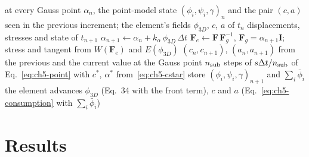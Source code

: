 \begin{algorithm}[htbp]
\caption{One increment $t_n\to t_{n+1}$ of the coupled run}
\label{alg:ch5-coupled}
\begin{algorithmic}[1]
\REQUIRE at every Gauss point $\alpha_n$, the point-model state $(\phi_i,\psi_i,\gamma)_n$ and the pair
  $(c,a)$ seen in the previous increment; the element's fields $\phi_{3D}$, $c$, $a$ of $t_n$
\ENSURE displacements, stresses and state of $t_{n+1}$
    \STATE $\alpha_{n+1}\leftarrow\alpha_n+k_\alpha\,\phi_{3D}\,\Delta t$ 
    \STATE $\mathbf F_e\leftarrow\mathbf F\,\mathbf F_g^{-1}$, $\mathbf F_g=\alpha_{n+1}\mathbf I$; stress and tangent from $W(\mathbf F_e)$ and $E(\phi_{3D})$
        \STATE $(c_n,c_{n+1})$, $(a_n,a_{n+1})$ from the previous and the current value at the Gauss point
        \STATE $n_{\rm sub}$ steps of $s\Delta t/n_{\rm sub}$ of Eq.~\eqref{eq:ch5-point} with $c^*$, $\alpha^*$ from~\eqref{eq:ch5-cstar}
        \STATE store $(\phi_i,\psi_i,\gamma)_{n+1}$ and $\sum_i\bar\phi_i$
      \ENDIF
    \ENDIF
  \ENDFOR
{}
\STATE the element advances $\phi_{3D}$ (Eq.~34 with the front term), $c$ and $a$ (Eq.~\eqref{eq:ch5-consumption} with $\sum_i\bar\phi_i$)
\end{algorithmic}
\end{algorithm}

\section{Results}
\label{sec:ch5-results}

